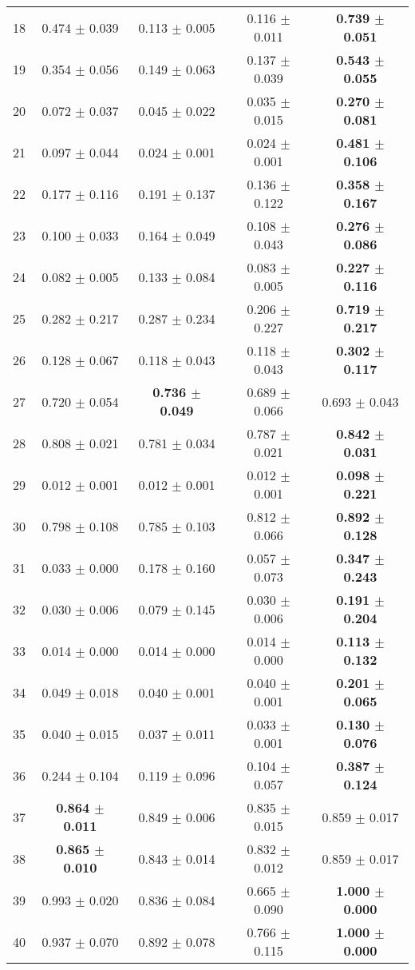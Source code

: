 \begin{table}[!ht]
{\begin{tabular}{r c c c c}
18 & 0.474 $\pm$ 0.039 & 0.113 $\pm$ 0.005 & 0.116 $\pm$ 0.011 & \textbf{0.739 $\pm$ 0.051} \\
19 & 0.354 $\pm$ 0.056 & 0.149 $\pm$ 0.063 & 0.137 $\pm$ 0.039 & \textbf{0.543 $\pm$ 0.055} \\
20 & 0.072 $\pm$ 0.037 & 0.045 $\pm$ 0.022 & 0.035 $\pm$ 0.015 & \textbf{0.270 $\pm$ 0.081} \\
21 & 0.097 $\pm$ 0.044 & 0.024 $\pm$ 0.001 & 0.024 $\pm$ 0.001 & \textbf{0.481 $\pm$ 0.106} \\
22 & 0.177 $\pm$ 0.116 & 0.191 $\pm$ 0.137 & 0.136 $\pm$ 0.122 & \textbf{0.358 $\pm$ 0.167} \\
23 & 0.100 $\pm$ 0.033 & 0.164 $\pm$ 0.049 & 0.108 $\pm$ 0.043 & \textbf{0.276 $\pm$ 0.086} \\
24 & 0.082 $\pm$ 0.005 & 0.133 $\pm$ 0.084 & 0.083 $\pm$ 0.005 & \textbf{0.227 $\pm$ 0.116} \\
25 & 0.282 $\pm$ 0.217 & 0.287 $\pm$ 0.234 & 0.206 $\pm$ 0.227 & \textbf{0.719 $\pm$ 0.217} \\
26 & 0.128 $\pm$ 0.067 & 0.118 $\pm$ 0.043 & 0.118 $\pm$ 0.043 & \textbf{0.302 $\pm$ 0.117} \\
27 & 0.720 $\pm$ 0.054 & \textbf{0.736 $\pm$ 0.049} & 0.689 $\pm$ 0.066 & 0.693 $\pm$ 0.043 \\
28 & 0.808 $\pm$ 0.021 & 0.781 $\pm$ 0.034 & 0.787 $\pm$ 0.021 & \textbf{0.842 $\pm$ 0.031} \\
29 & 0.012 $\pm$ 0.001 & 0.012 $\pm$ 0.001 & 0.012 $\pm$ 0.001 & \textbf{0.098 $\pm$ 0.221} \\
30 & 0.798 $\pm$ 0.108 & 0.785 $\pm$ 0.103 & 0.812 $\pm$ 0.066 & \textbf{0.892 $\pm$ 0.128} \\
31 & 0.033 $\pm$ 0.000 & 0.178 $\pm$ 0.160 & 0.057 $\pm$ 0.073 & \textbf{0.347 $\pm$ 0.243} \\
32 & 0.030 $\pm$ 0.006 & 0.079 $\pm$ 0.145 & 0.030 $\pm$ 0.006 & \textbf{0.191 $\pm$ 0.204} \\
33 & 0.014 $\pm$ 0.000 & 0.014 $\pm$ 0.000 & 0.014 $\pm$ 0.000 & \textbf{0.113 $\pm$ 0.132} \\
34 & 0.049 $\pm$ 0.018 & 0.040 $\pm$ 0.001 & 0.040 $\pm$ 0.001 & \textbf{0.201 $\pm$ 0.065} \\
35 & 0.040 $\pm$ 0.015 & 0.037 $\pm$ 0.011 & 0.033 $\pm$ 0.001 & \textbf{0.130 $\pm$ 0.076} \\
36 & 0.244 $\pm$ 0.104 & 0.119 $\pm$ 0.096 & 0.104 $\pm$ 0.057 & \textbf{0.387 $\pm$ 0.124} \\
37 & \textbf{0.864 $\pm$ 0.011} & 0.849 $\pm$ 0.006 & 0.835 $\pm$ 0.015 & 0.859 $\pm$ 0.017 \\
38 & \textbf{0.865 $\pm$ 0.010} & 0.843 $\pm$ 0.014 & 0.832 $\pm$ 0.012 & 0.859 $\pm$ 0.017 \\
39 & 0.993 $\pm$ 0.020 & 0.836 $\pm$ 0.084 & 0.665 $\pm$ 0.090 & \textbf{1.000 $\pm$ 0.000} \\
40 & 0.937 $\pm$ 0.070 & 0.892 $\pm$ 0.078 & 0.766 $\pm$ 0.115 & \textbf{1.000 $\pm$ 0.000} \\
\end{tabular}}
\end{table}
